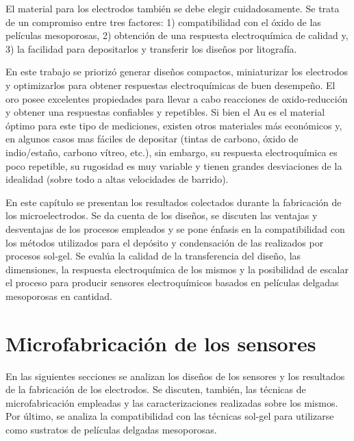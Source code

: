 	El material para los electrodos también se debe elegir cuidadosamente. Se trata de un compromiso entre tres factores: 1) compatibilidad con el óxido de las películas mesoporosas, 2) obtención de una respuesta electroquímica de calidad y, 3) la facilidad para depositarlos y transferir los diseños por litografía.

	En este trabajo se priorizó generar diseños compactos, miniaturizar los electrodos y optimizarlos para obtener respuestas electroquímicas de buen desempeño. El oro posee excelentes propiedades para llevar a cabo reacciones de oxido-reducción y obtener una respuestas confiables y repetibles. Si bien el Au es el material óptimo para este tipo de mediciones, existen otros materiales más económicos y, en algunos casos mas fáciles de depositar (tintas de carbono, óxido de indio/estaño, carbono vítreo, etc.), sin embargo, su respuesta electroquímica es poco repetible, su rugosidad es muy variable y tienen grandes desviaciones de la idealidad (sobre todo a altas velocidades de barrido).\cite{Wi2000,Villullas2000}

	En este capítulo se presentan los resultados colectados durante la fabricación de los microelectrodos. Se da cuenta de los diseños, se discuten las ventajas y desventajas de los procesos empleados y se pone énfasis en la compatibilidad con los métodos utilizados para el depósito y condensación de las \pdm\space realizados por procesos sol-gel. Se evalúa la calidad de la transferencia del diseño, las dimensiones, la respuesta electroquímica de los mismos y la posibilidad de escalar el proceso para producir sensores electroquímicos basados en películas delgadas mesoporosas en cantidad.
	
\section{Microfabricación de los sensores}\label{sec:microfabricaci_n_de_los_sensores}
		
	 	 En las siguientes secciones se analizan los diseños de los sensores y los resultados de la fabricación de los electrodos. Se discuten, también, las técnicas de microfabricación empleadas y las caracterizaciones realizadas sobre los mismos. Por último, se analiza la compatibilidad con las técnicas sol-gel para utilizarse como sustratos de películas delgadas mesoporosas.

